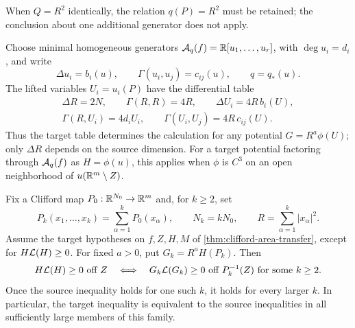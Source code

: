 When $Q=R^2$ identically, the relation $q(P)=R^2$ must be retained;
the conclusion about one additional generator does not apply.

Choose minimal homogeneous generators
$\mathcal A_q(f)=\mathbb R[u_1,\ldots,u_r]$, with $\deg u_i=d_i$, and write
\[
 \Delta u_i=b_i(u),\qquad \Gamma(u_i,u_j)=c_{ij}(u),\qquad q=q_*(u).
\]
The lifted variables $U_i=u_i(P)$ have the differential table
\begin{equation}\label{eq:clifford-minimal-table}
\begin{gathered}
 \Delta R=2N,\qquad \Gamma(R,R)=4R,\qquad
 \Delta U_i=4R\,b_i(U),\\
 \Gamma(R,U_i)=4d_iU_i,\qquad
 \Gamma(U_i,U_j)=4R\,c_{ij}(U).
\end{gathered}
\end{equation}
Thus the target table determines the calculation for any potential
$G=R^a\phi(U)$; only $\Delta R$ depends on the source dimension.
For a target potential factoring through $\mathcal A_q(f)$ as $H=\phi(u)$,
this applies when $\phi$ is $C^3$ on an open neighborhood of
$u(\mathbb R^m\setminus Z)$.

\begin{proposition}
\label{prop:clifford-transfer-monotonicity}
Fix a Clifford map $P_0:\mathbb R^{N_0}\to\mathbb R^m$ and, for $k\ge2$, set
\[
 P_k(x_1,\ldots,x_k)=\sum_{\alpha=1}^kP_0(x_\alpha),
 \qquad N_k=kN_0,\qquad R=\sum_{\alpha=1}^k|x_\alpha|^2.
\]
Assume the target hypotheses on $f,Z,H,M$ of
\cref{thm:clifford-area-transfer}, except for $H\mathcal L(H)\ge0$.
For fixed $a>0$, put $G_k=R^aH(P_k)$. Then
\[
 H\mathcal L(H)\ge0\text{ off }Z
 \quad\Longleftrightarrow\quad
 G_k\mathcal L(G_k)\ge0\text{ off }P_k^{-1}(Z)
 \text{ for some }k\ge2.
\]
Once the source inequality holds for one such $k$, it holds for every
larger $k$. In particular, the target inequality is equivalent to the
source inequalities in all sufficiently large members of this family.
\end{proposition}

